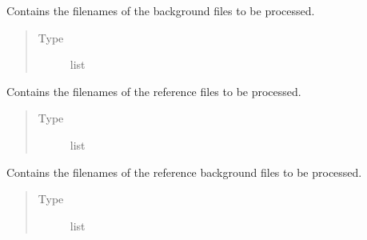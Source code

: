 \documentclass[a4paper,10pt,english]{sphinxmanual}
\begin{document}
\begin{fulllineitems}
\begin{fulllineitems}
\begin{quote}
\begin{description}
\end{description}\end{quote}

\end{fulllineitems}


\begin{fulllineitems}
\label{\detokenize{sfgtools:sfgtools.SFGProcessTools.bg_names}}
\sphinxAtStartPar
Contains the filenames of the background files to be processed.
\begin{quote}\begin{description}
\item[{Type}] \leavevmode
\sphinxAtStartPar
list

\end{description}\end{quote}

\end{fulllineitems}


\begin{fulllineitems}
\label{\detokenize{sfgtools:sfgtools.SFGProcessTools.ref_names}}
\sphinxAtStartPar
Contains the filenames of the reference files to be processed.
\begin{quote}\begin{description}
\item[{Type}] \leavevmode
\sphinxAtStartPar
list

\end{description}\end{quote}

\end{fulllineitems}


\begin{fulllineitems}
\label{\detokenize{sfgtools:sfgtools.SFGProcessTools.ref_bg_names}}
\sphinxAtStartPar
Contains the filenames of the reference background files to be processed.
\begin{quote}\begin{description}
\item[{Type}] \leavevmode
\sphinxAtStartPar
list


\end{description}
\end{quote}
\end{fulllineitems}
\end{fulllineitems}
\end{document}
